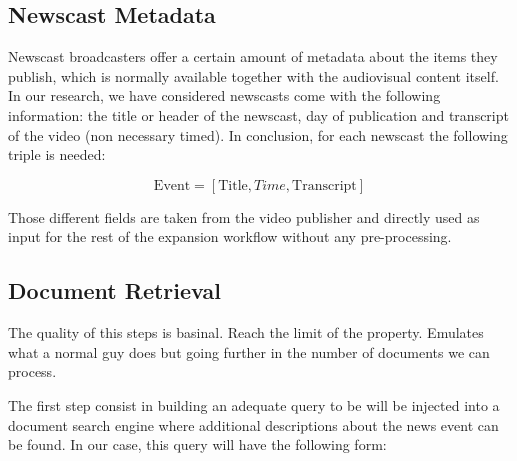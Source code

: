 \documentclass{llncs}
\begin{document}
\subsection{Newscast Metadata}


Newscast broadcasters offer a certain amount of metadata about the items they publish, which is normally available together with the audiovisual content itself. In our research, we have considered newscasts come with the following information: the title or header of the newscast, day of publication and transcript of the video (non necessary timed). In conclusion, for each newscast the following triple is needed:

\begin{equation}
\text{Event} =\left [ \text{Title}, Time, \text{Transcript} \right ]
\end{equation}

Those different fields are taken from the video publisher and directly used as input for the rest of the expansion workflow without any pre-processing.

\subsection{Document Retrieval}

The quality of this steps is basinal.
Reach the limit of the property.
Emulates what a normal guy does but going further in the number of documents we can process.

The first step consist in building an adequate query to be will be injected into a document search engine where additional descriptions about the news event can be found. In our case, this query will have the following form:
 
\end{document}
